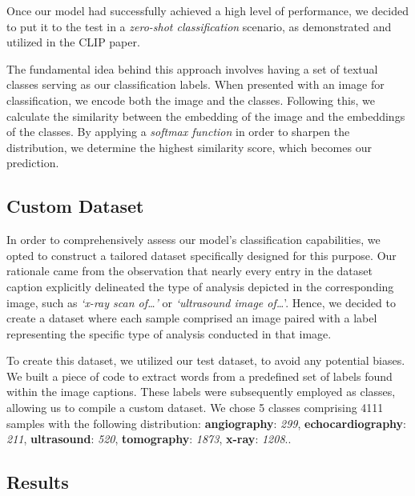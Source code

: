 \documentclass[10pt,twocolumn,letterpaper]{article}
\begin{document}
Once our model had successfully achieved a high level of performance, we decided to put it to the test in a \textit{zero-shot classification} scenario, as demonstrated and utilized in the CLIP paper.

The fundamental idea behind this approach involves having a set of textual classes serving as our classification labels. When presented with an image for classification, we encode both the image and the classes. Following this, we calculate the similarity between the embedding of the image and the embeddings of the classes. By applying a \textit{softmax function} in order to sharpen the distribution, we determine the highest similarity score, which becomes our prediction.

\subsection{Custom Dataset}
In order to comprehensively assess our model's classification capabilities, we opted to construct a tailored dataset specifically designed for this purpose. Our rationale came from the observation that nearly every entry in the dataset caption explicitly delineated the type of analysis depicted in the corresponding image, such as \textit{`x-ray scan of\ldots'} or \textit{ `ultrasound image of\ldots}'. Hence, we decided to create a dataset where each sample comprised an image paired with a label representing the specific type of analysis conducted in that image.

To create this dataset, we utilized our test dataset, to avoid any potential biases. We built a piece of code to extract words from a predefined set of labels found within the image captions. These labels were subsequently employed as classes, allowing us to compile a custom dataset. We chose 5 classes comprising 4111 samples with the following distribution: \textbf{angiography}: \textit{299}, \textbf{echocardiography}: \textit{211}, \textbf{ultrasound}: \textit{520}, \textbf{tomography}: \textit{1873}, \textbf{x-ray}: \textit{1208}..


\subsection{Results}
\end{document}
